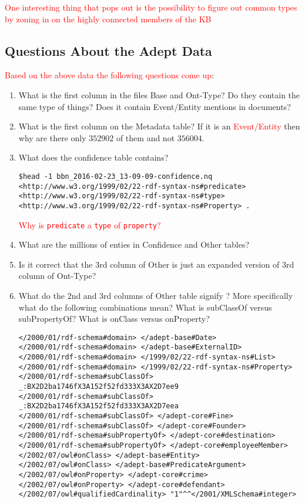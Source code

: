 \documentclass{tufte-handout}
\newcommand{\alert}[1]{\textcolor{red}{#1}}
\begin{document}
\alert{One interesting thing that pops out is the possibility to figure out
  common types by zoning in on the highly connected members of the KB}
\clearpage

\subsection{Questions About the Adept Data}
\label{sec:quest-about-adept}

\alert{Based on the above data the following questions come up}:
\begin{enumerate}
\item What is the first column in the files Base and Ont-Type? Do they contain
  the same type of things? Does it contain Event/Entity mentions in documents?
\item What is the first column on the Metadata table? If it is an
  \alert{Event/Entity} then why are there only $352902$ of them and not
  $356004$.
\item What does the confidence table contains?
\begin{verbatim}
$head -1 bbn_2016-02-23_13-09-09-confidence.nq
<http://www.w3.org/1999/02/22-rdf-syntax-ns#predicate> <http://www.w3.org/1999/02/22-rdf-syntax-ns#type> <http://www.w3.org/1999/02/22-rdf-syntax-ns#Property> .
\end{verbatim}
\alert{Why is \texttt{predicate} a \texttt{type} of \texttt{property}?}
\item What are the millions of enties in Confidence and Other tables?
\item Is it correct that the 3rd column of Other is just an expanded version of
  3rd column of Ont-Type?
\item What do the 2nd and 3rd columns of Other table signify ? More specifically
  what do the following combinations mean? What is subClassOf versus
  subPropertyOf? What is onClass versus onProperty?
\begin{verbatim}
</2000/01/rdf-schema#domain> </adept-base#Date>
</2000/01/rdf-schema#domain> </adept-base#ExternalID>
</2000/01/rdf-schema#domain> </1999/02/22-rdf-syntax-ns#List>
</2000/01/rdf-schema#domain> </1999/02/22-rdf-syntax-ns#Property>
</2000/01/rdf-schema#subClassOf> _:BX2D2ba1746fX3A152f52fd333X3AX2D7ee9
</2000/01/rdf-schema#subClassOf> _:BX2D2ba1746fX3A152f52fd333X3AX2D7eea
</2000/01/rdf-schema#subClassOf> </adept-core#Fine>
</2000/01/rdf-schema#subClassOf> </adept-core#Founder>
</2000/01/rdf-schema#subPropertyOf> </adept-core#destination>
</2000/01/rdf-schema#subPropertyOf> </adept-core#employeeMember>
</2002/07/owl#onClass> </adept-base#Entity>
</2002/07/owl#onClass> </adept-base#PredicateArgument>
</2002/07/owl#onProperty> </adept-core#crime>
</2002/07/owl#onProperty> </adept-core#defendant>
</2002/07/owl#qualifiedCardinality> "1"^^</2001/XMLSchema#integer>
\end{verbatim}

\end{enumerate}
\end{document}
